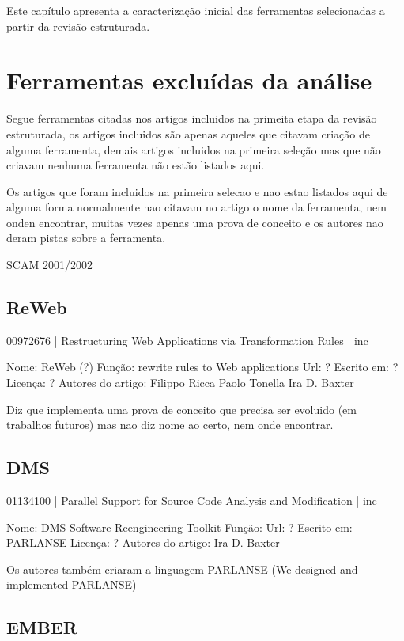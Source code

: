 {Este capítulo apresenta a caracterização inicial das ferramentas selecionadas a partir da revisão estruturada.}
\label{caracterizacao-ferramentas}

\section{Ferramentas excluídas da análise}

Segue ferramentas citadas nos artigos incluidos na primeita etapa da revisão
estruturada, os artigos incluidos são apenas aqueles que citavam criação de
alguma ferramenta, demais artigos incluidos na primeira seleção mas que não
criavam nenhuma ferramenta não estão listados aqui.

Os artigos que foram incluidos na primeira selecao e nao estao listados aqui de alguma forma
normalmente nao citavam no artigo o nome da ferramenta, nem onden encontrar, muitas vezes
apenas uma prova de conceito e os autores nao deram pistas sobre a ferramenta.

SCAM 2001/2002

\subsection{ReWeb}

00972676 | Restructuring Web Applications via Transformation Rules | inc

Nome: ReWeb (?)
Função: rewrite rules to Web applications
Url: ?
Escrito em: ?
Licença: ?
Autores do artigo: Filippo Ricca
                   Paolo Tonella
                   Ira D. Baxter

Diz que implementa uma prova de conceito que precisa ser evoluido (em trabalhos futuros)
mas nao diz nome ao certo, nem onde encontrar.

\subsection{DMS}

01134100 | Parallel Support for Source Code Analysis and Modification | inc

Nome: DMS Software Reengineering Toolkit
Função: 
Url: ?
Escrito em: PARLANSE
Licença: ?
Autores do artigo: Ira D. Baxter

Os autores também criaram a linguagem PARLANSE (We designed and implemented PARLANSE)

\subsection{EMBER}

